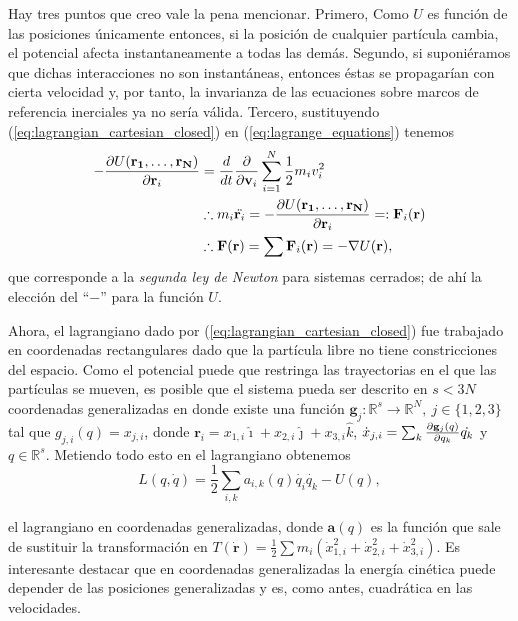 Hay tres puntos que creo vale la pena mencionar. Primero, Como $U$ es función de las posiciones únicamente entonces, si la posición de cualquier partícula cambia, el potencial  afecta instantaneamente a todas las demás. Segundo, si suponiéramos que dichas interacciones no son instantáneas, entonces éstas se propagarían con cierta velocidad y, por tanto, la invarianza de las ecuaciones sobre marcos de referencia inerciales ya no sería válida. Tercero, sustituyendo (\ref{eq:lagrangian_cartesian_closed}) en (\ref{eq:lagrange_equations}) tenemos
\begin{align}
 -\frac{\partial U(\mathbf{r_1}, \ldots, \mathbf{r_N})}{\partial \mathbf{r}_i} &= \frac{d}{dt} \frac{\partial }{\partial \mathbf{v}_i} \sum_{i=1}^N \frac{1}{2}m_i v_i^2 \nonumber \\
 &\therefore m_i \ddot{\mathbf{r}_i} = -\frac{\partial U(\mathbf{r_1}, \ldots, \mathbf{r_N})}{\partial \mathbf{r}_i} =: \mathbf{F}_i(\mathbf{r}) \nonumber \\
 &\therefore \mathbf{F}(\mathbf{r}) = \sum \mathbf{F}_i(\mathbf{r}) = - \nabla U(\mathbf{r}),
 \label{eq:newton_second_law}
\end{align}
que corresponde a la \textit{segunda ley de Newton} para sistemas cerrados; de ahí la elección del ``$-$'' para la función $U$.

Ahora, el lagrangiano dado por (\ref{eq:lagrangian_cartesian_closed}) fue trabajado en coordenadas rectangulares dado que la partícula libre no tiene constricciones del espacio. Como el potencial puede que restringa las trayectorias en el que las partículas se mueven, es posible que el sistema pueda ser descrito en $s < 3N$  coordenadas generalizadas en donde existe una función $\mathbf{g}_j: \mathbb{R}^{s} \to \mathbb{R}^{N}, \ j \in \{1,2,3\}$ tal que $g_{j,i}(q) = x_{j,i}$, donde $\mathbf{r}_i = x_{1,i} \hat{\imath} + x_{2,i} \hat{\jmath} + x_{3,i} \hat{k}$, $\dot{x}_{j,i} = \sum_k \frac{\partial \mathbf{g}_j(q)}{\partial q_k} \dot{q_k}$ y $q \in \mathbb{R}^s$. Metiendo todo esto en el lagrangiano obtenemos
\begin{equation}
 L(q,\dot{q}) = \frac{1}{2}\sum_{i,k} a_{i,k}(q) \dot{q_i}\dot{q_k} - U(q),
 \label{eq:lagrangian_closed_generalized}
\end{equation}

el lagrangiano en coordenadas generalizadas, donde $\mathbf{a}(q)$ es la función que sale de sustituir la transformación en $T(\dot{\mathbf{r}}) = \frac{1}{2}\sum m_i \left( \dot{x}_{1,i}^2 + \dot{x}_{2,i}^2 + \dot{x}_{3,i}^2 \right)$. Es interesante destacar que en coordenadas generalizadas la energía cinética puede depender de las posiciones generalizadas y es, como antes, cuadrática en las velocidades. 

